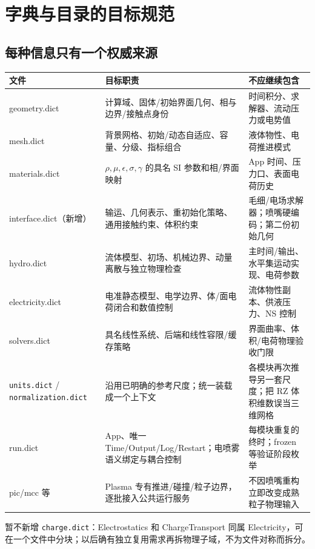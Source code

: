 \documentclass[UTF8,a4paper,11pt,fontset=fandol]{ctexart}
\numberwithin{equation}{section}
\newcommand{\code}[1]{\nolinkurl{#1}}
\begin{document}
\section{字典与目录的目标规范}\label{sec:dict}
\subsection{每种信息只有一个权威来源}
\begin{longtable}{@{}P{.20\textwidth}P{.46\textwidth}P{.28\textwidth}@{}}
\toprule 文件 & 目标职责 & 不应继续包含\\\midrule\endhead
geometry.dict & 计算域、固体/初始界面几何、相与边界/接触点身份 & 时间积分、求解器、流动压力或电势值\\
mesh.dict & 背景网格、初始/动态自适应、容量、分级、指标组合 & 液体物性、电荷推进模式\\
materials.dict & $\rho,\mu,\epsilon,\sigma,\gamma$ 的具名 SI 参数和相/界面映射 & App 时间、压力口、表面电荷历史\\
interface.dict（新增） & 输运、几何表示、重初始化策略、通用接触约束、体积约束 & 毛细/电场求解器；喷嘴硬编码；第二份初始几何\\
hydro.dict & 流体模型、初场、机械边界、动量离散与独立物理检查 & 主时间/输出、水平集运动实现、电荷参数\\
electricity.dict & 电准静态模型、电学边界、体/面电荷闭合和数值控制 & 流体物性副本、供液压力、NS 控制\\
solvers.dict & 具名线性系统、后端和线性容限/缓存策略 & 界面曲率、体积/电荷物理验收门限\\
\code{units.dict} / \code{normalization.dict} & 沿用已明确的参考尺度；统一装载成一个上下文 & 各模块再次推导另一套尺度；把 RZ 体积维数误当三维网格\\
run.dict & App、唯一 Time/Output/Log/Restart；电喷雾语义绑定与耦合控制 & 每模块重复的终时；frozen 等验证阶段枚举\\
pic/mcc 等 & Plasma 专有推进/碰撞/粒子边界，逐批接入公共运行服务 & 不因喷嘴重构立即改变成熟粒子物理输入\\
\bottomrule
\end{longtable}
暂不新增 \code{charge.dict}：Electrostatics 和 ChargeTransport 同属 Electricity，可在一个文件中分块；以后确有独立复用需求再拆物理子域，不为文件对称而拆分。
\end{document}
